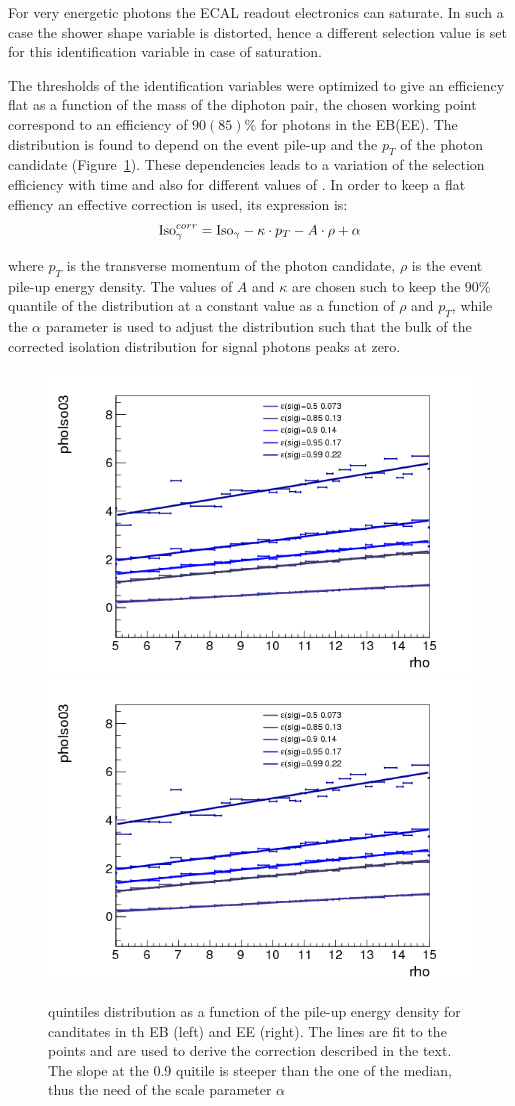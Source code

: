 For very energetic photons the ECAL readout electronics can saturate. In such a case the shower shape variable
\sieie is distorted, hence a different selection value is set for this identification variable in case of saturation.

The thresholds of the identification variables were optimized to give an efficiency flat as a function
of the mass of the diphoton pair, the chosen working point correspond to an efficiency of $90(85)\%$ for
photons in the EB(EE).
The \phoIso distribution is found to depend on the event pile-up and the $p_T$ of the
photon candidate (Figure~\ref{fig:phoiso_qtiles}).
These dependencies leads to a variation of the selection efficiency with time and also
for different values of \mgg. In order to keep a flat effiency an effective correction is used, its expression is:
\[
  \mathrm{Iso}_\gamma^{corr} = \mathrm{Iso}_\gamma - \kappa\cdot p_T - A \cdot \rho + \alpha
\]

where $p_T$ is the transverse momentum of the photon candidate, $\rho$ is the event pile-up energy density.
The values of $A$ and $\kappa$ are chosen such to keep the $90\%$ quantile of the distribution at a constant
value as a function of $\rho$ and $p_T$, while the $\alpha$ parameter is used to adjust the distribution such
that the bulk of the corrected isolation distribution for signal photons peaks at zero.

\begin{figure}[!h]
  \centering
  \includegraphics[width = .45\textwidth]{figures/diphotons/qtiles_phoIso03_outerEB.png}
  \includegraphics[width = .45\textwidth]{figures/diphotons/qtiles_phoIso03_outerEB.png}
  \caption{\phoIso quintiles distribution as a function of the pile-up energy density for canditates in th EB  (left) and
    EE (right). The lines are fit to the points and are used to derive the correction described in the text.
  The slope at the 0.9 quitile is steeper than the one of the median, thus the need of the scale parameter $\alpha$}
  \label{fig:phoiso_qtiles}
\end{figure}

